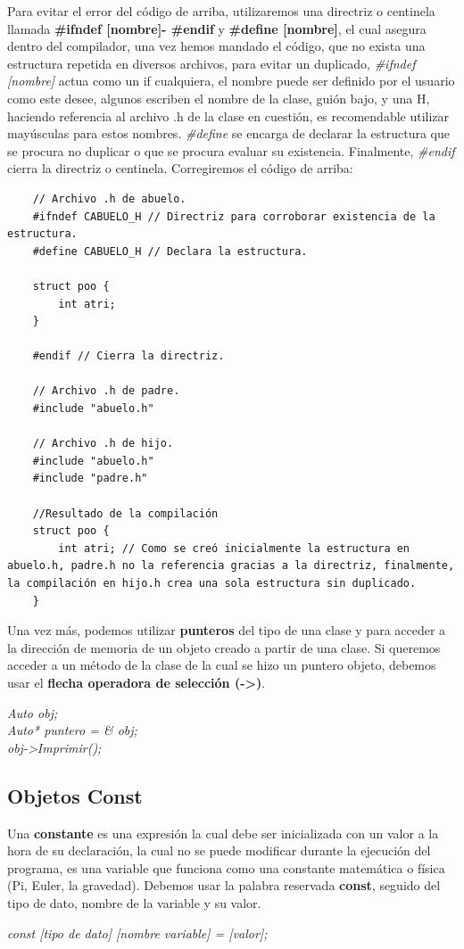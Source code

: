 Para evitar el error del código de arriba, utilizaremos una directriz o centinela llamada \textbf{\#ifndef [nombre]- \#endif} y \textbf{\#define [nombre]}, el cual asegura dentro del compilador, una vez hemos mandado el código, que no exista una estructura repetida en diversos archivos, para evitar un duplicado, \textit{\#ifndef [nombre]} actua como un if cualquiera, el nombre puede ser definido por el usuario como este desee, algunos escriben el nombre de la clase, guión bajo, y una H, haciendo referencia al archivo .h de la clase en cuestión, es recomendable utilizar mayúsculas para estos nombres. \textit{\#define} se encarga de declarar la estructura que se procura no duplicar o que se procura evaluar su existencia. Finalmente, \textit{\#endif} cierra la directriz o centinela. Corregiremos el código de arriba:
\begin{lstlisting}
    // Archivo .h de abuelo.
    #ifndef CABUELO_H // Directriz para corroborar existencia de la estructura.
    #define CABUELO_H // Declara la estructura.
    
    struct poo {
        int atri;
    }
    
    #endif // Cierra la directriz.
    
    // Archivo .h de padre.
    #include "abuelo.h"
    
    // Archivo .h de hijo.
    #include "abuelo.h"
    #include "padre.h"
    
    //Resultado de la compilación
    struct poo {
        int atri; // Como se creó inicialmente la estructura en abuelo.h, padre.h no la referencia gracias a la directriz, finalmente, la compilación en hijo.h crea una sola estructura sin duplicado.
    }
\end{lstlisting}

Una vez más, podemos utilizar \textbf{punteros} del tipo de una clase y para acceder a la dirección de memoria de un objeto creado a partir de una clase. Si queremos acceder a un método de la clase de la cual se hizo un puntero objeto, debemos usar  el \textbf{flecha operadora de selección (->)}.
\begin{center}
	\textit{
		Auto obj; \\
		Auto* puntero = \& obj; \\
		obj->Imprimir();
	}
\end{center}


\subsection{Objetos Const}
\hspace{0.55cm}Una \textbf{constante} es una expresión la cual debe ser inicializada con un valor a la hora de su declaración, la cual no se puede modificar durante la ejecución del programa, es una variable que funciona como una constante matemática o física (Pi, Euler, la gravedad). Debemos usar la palabra reservada \textbf{const}, seguido del tipo de dato, nombre de la variable y su valor.
\begin{center}
	\textit{const [tipo de dato] [nombre variable] = [valor];}
\end{center}

